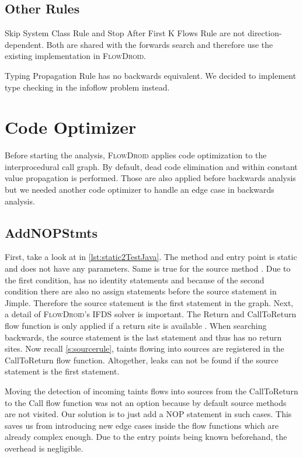 \documentclass[../draft.tex]{subfiles}
\begin{document}
    \subsection{Other Rules}
    Skip System Class Rule and Stop After First K Flows Rule are not direction-dependent. Both are shared with the forwards search and therefore use the existing implementation in \textsc{FlowDroid}.
    
    Typing Propagation Rule has no backwards equivalent. We decided to implement type checking in the infoflow problem instead.



    \section{Code Optimizer}
    Before starting the analysis, \textsc{FlowDroid} applies code optimization to the interprocedural call graph. By default, dead code elimination and within constant value propagation is performed. Those are also applied before backwards analysis but we needed another code optimizer to handle an edge case in backwards analysis.

    \subsection{AddNOPStmts}
    First, take a look at  in \autoref{lst:static2TestJava}. The method and entry point  is static and does not have any parameters. Same is true for the source method . Due to the first condition,  has no identity statements and because of the second  condition there are also no assign statements before the source statement in Jimple. Therefore the source statement is the first statement in the graph. 
    Next, a detail of \textsc{FlowDroid}'s IFDS solver is important. The Return and CallToReturn flow function is only applied if a return site is available \cite{Arzt2017PhD}.
    When searching backwards, the source statement is the last statement and thus has no return sites. Now recall \autoref{s:sourcerule}, taints flowing into sources are registered in the CallToReturn flow function. Altogether, leaks can not be found if the source statement is the first statement.

    Moving the detection of incoming taints flows into sources from the CallToReturn to the Call flow function was not an option because by default source methods are not visited. 
    Our solution is to just add a NOP statement in such cases. This saves us from introducing new edge cases inside the flow functions which are already complex enough. Due to the entry points being known beforehand, the overhead is negligible.
\end{document}
